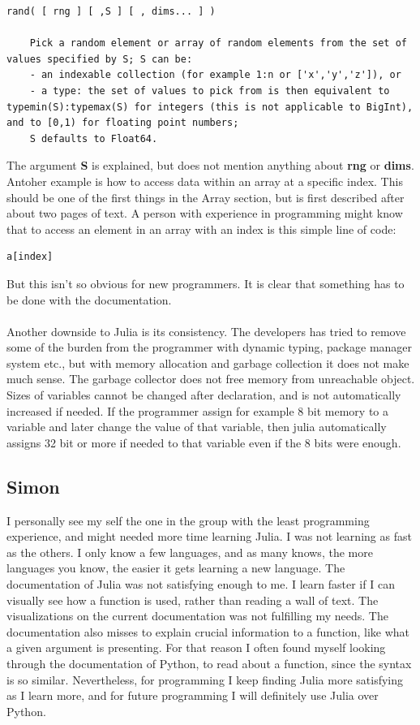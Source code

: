 \documentclass[a4paper, 11pt, titlepage]{article}
\begin{document}
\begin{lstlisting}
rand( [ rng ] [ ,S ] [ , dims... ] )

	Pick a random element or array of random elements from the set of values specified by S; S can be:
	- an indexable collection (for example 1:n or ['x','y','z']), or  
	- a type: the set of values to pick from is then equivalent to typemin(S):typemax(S) for integers (this is not applicable to BigInt), and to [0,1) for floating point numbers;  
	S defaults to Float64.
\end{lstlisting} 
The argument \textbf{S} is explained, but does not mention anything about \textbf{rng} or \textbf{dims}.\\
Antoher example is how to access data within an array at a specific index. This should be one of the first things in the Array section, but is first described after about two pages of text. A person with experience in programming might know that to access an element in an array with an index is this simple line of code:
\begin{lstlisting}
a[index]
\end{lstlisting} 
But this isn’t so obvious for new programmers. It is clear that something has to be done with the documentation.\\
\\ 
Another downside to Julia is its consistency. The developers has tried to remove some of the burden from the programmer with dynamic typing, package manager system etc., but with memory allocation and garbage collection it does not make much sense. The garbage collector does not free memory from unreachable object. Sizes of variables cannot be changed after declaration, and is not automatically increased if needed. If the programmer assign for example 8 bit memory to a variable and later change the value of that variable, then julia automatically assigns 32 bit or more if needed to that variable even if the 8 bits were enough. 
\subsection{Simon}
I personally see my self the one in the group with the least programming experience, and might needed more time learning Julia. I was not learning as fast as the others. I only know a few languages, and as many knows, the more languages you know, the easier it gets learning a new language. The documentation of Julia was not satisfying enough to me. I learn faster if I can visually see how a function is used, rather than reading a wall of text. The visualizations on the current documentation was not fulfilling my needs. The documentation also misses to explain crucial information to a function, like what a given argument is presenting. For that reason I often found myself looking through the documentation of Python, to read about a function, since the syntax is so similar. Nevertheless, for programming I keep finding Julia more satisfying as I learn more, and for future programming I will definitely use Julia over Python.
\end{document}

